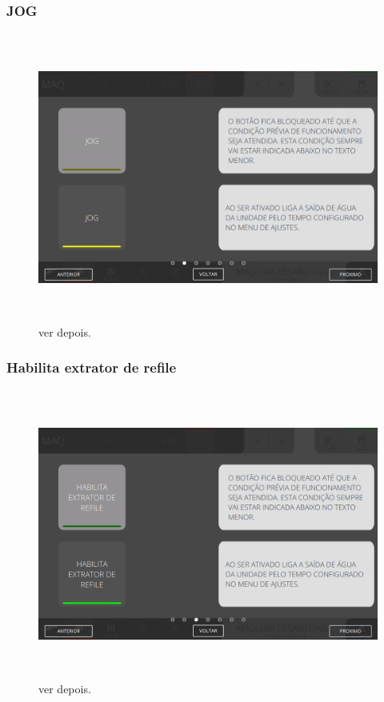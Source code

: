 \newpage
\thispagestyle{fancy}
\vspace*{\fill}
\subsubsection{\small{JOG}}
\begin{figure}[h]
  \centering
  \includegraphics[width=576px,height=360px]{src/imagesFlexo/07-fold/commands/e-2.png}
  \caption{ver depois.}
   \label{}
\end{figure}
\vspace*{\fill}

\newpage
\thispagestyle{fancy}
\vspace*{\fill}
\subsubsection{\small{Habilita extrator de refile}}
\begin{figure}[h]
  \centering
  \includegraphics[width=576px,height=360px]{src/imagesFlexo/07-fold/commands/e-3.png}
  \caption{ver depois.}
   \label{}
\end{figure}
\vspace*{\fill}

